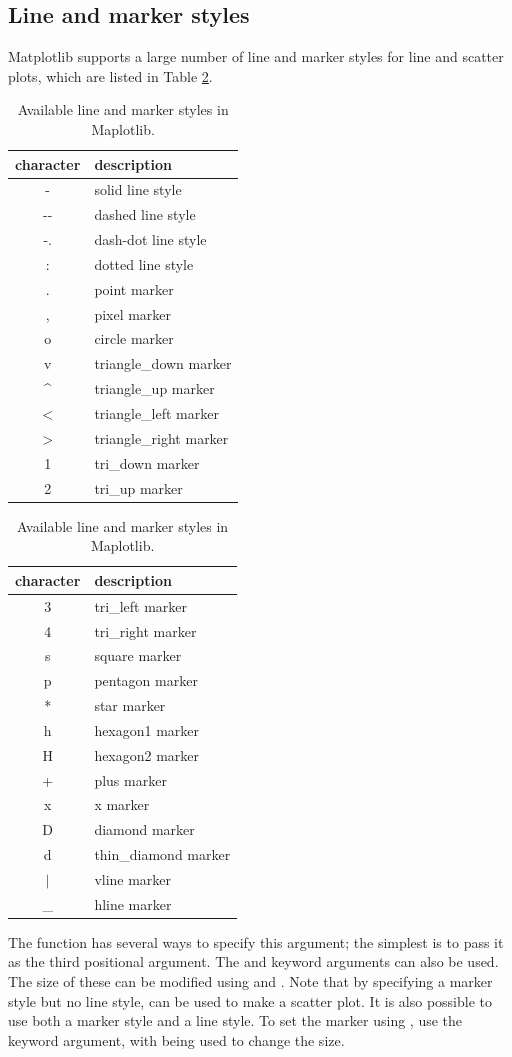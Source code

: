 \subsection*{Line and marker styles}
Matplotlib supports a large number of line and marker styles for line and scatter plots, which are listed in Table \ref{mpl:table-lmstyles}.
\begin{table}[H] %
\centering
\begin{tabular}{c|l}
    character & description \\
    \hline
    - & solid line style \\
    -{}- & dashed line style\\
    -. & dash-dot line style \\
    : & dotted line style \\
    . & point marker \\
    , & pixel marker \\
    o & circle marker \\
    v & triangle\_down marker \\
    \^{} & triangle\_up marker \\
    $<$ & triangle\_left marker \\
    $>$ & triangle\_right marker \\
    1 & tri\_down marker \\
    2 & tri\_up marker \\
\end{tabular}
	\quad
\begin{tabular}{c|l}
    character & description \\
    \hline
    3 & tri\_left marker \\
    4 & tri\_right marker \\
    s & square marker \\
    p & pentagon marker \\
    * & star marker \\
    h & hexagon1 marker \\
    H & hexagon2 marker \\
    + & plus marker \\
    x & x marker \\
    D & diamond marker \\
    d & thin\_diamond marker \\
    $|$ & vline marker \\
    \_{} & hline marker \\
\end{tabular}
\caption{Available line and marker styles in Maplotlib.}
\label{mpl:table-lmstyles} 
\end{table}
The function  has several ways to specify this argument; the simplest is to pass it as the third positional argument.
The  and  keyword arguments can also be used.
The size of these can be modified using  and .
Note that by specifying a marker style but no line style,  can be used to make a scatter plot.
It is also possible to use both a marker style and a line style.
To set the marker using , use the  keyword argument, with  being used to change the size.

